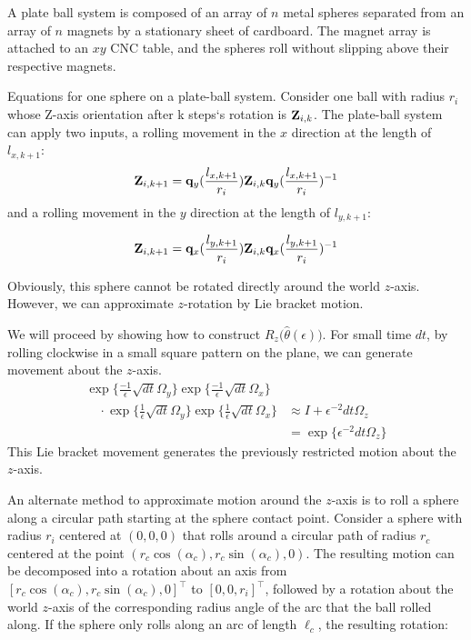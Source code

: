 \documentclass[letter paper, 10pt, conference]{ieeeconf}
\begin{document}
A plate ball system is composed of an array of $n$ metal spheres separated from an array of $n$ magnets by a stationary sheet of cardboard.  The magnet array is attached to an $xy$ CNC table, and the spheres roll without slipping above their respective magnets.



Equations for one sphere on a plate-ball system.  Consider one ball with radius $r_i$ whose Z-axis orientation after k steps`s rotation is ${\bf Z}_{i,k}$.  The plate-ball system can apply two inputs, a rolling movement in the $x$ direction at the length of $l_{x,k+1}$:
\begin{align}
{\bf Z}_{i,k+1}={\bf q}_y(\frac{l_{x,k+1}}{r_i}){\bf Z}_{i,k}{\bf q}_y(\frac{l_{x,k+1}}{r_i})^{-1} \label{eq:PlateBallXrotation}
\end{align}
 and a rolling movement in the $y$ direction at the length of $l_{y,k+1}$:


\begin{align}
{\bf Z}_{i,k+1}={\bf q}_x(\frac{l_{y,k+1}}{r_i}){\bf Z}_{i,k}{\bf q}_x(\frac{l_{y,k+1}}{r_i})^{-1} \label{eq:PlateBallYrotations}
\end{align}

Obviously, this sphere cannot be rotated directly around the world $z$-axis.  However, we can approximate $z$-rotation by Lie bracket motion.

We will proceed by showing how to construct $R_z\!\big(\hat\theta(\epsilon)\big)$.
For small time $dt$, by rolling clockwise in a small square pattern on the plane, we can generate movement about the $z$-axis.
\begin{align*}
\exp\{\frac{-1}{\epsilon} \sqrt{dt} \Omega_y\}
  		    \exp\{\frac{-1}{\epsilon} \sqrt{dt} \Omega_x\}&  \\
	\quad \cdot		     \exp\{\frac{1}{\epsilon} \sqrt{dt} \Omega_y\}  
		      \exp\{\frac{1}{\epsilon} \sqrt{dt} \Omega_x\} &\approx  I + \epsilon^{-2} dt \Omega_z\\
	  &=  \exp\{ \epsilon^{-2} dt  \Omega_z\}
	  \end{align*}
This Lie bracket movement generates the previously restricted motion about the $z$-axis.	    

An alternate method to approximate motion around the $z$-axis is to roll a sphere  along a circular path starting at the sphere contact point.
Consider a sphere with radius $r_i$ centered at $(0,0,0)$ that rolls around a circular path of radius $r_c$ centered at the point $ (r_c\cos(\alpha_c), r_c\sin(\alpha_c),0)$.  The resulting motion can be decomposed into a rotation about an axis from $[ r_c \cos(\alpha_c), r_c\sin(\alpha_c),0]^\top$ to $[ 0,0,r_i]^\top$, followed by a rotation about the world $z$-axis of the corresponding radius angle of the arc that the ball rolled along.
If the sphere only rolls along an arc of length $\ell_c$, the resulting rotation:
\end{document}
